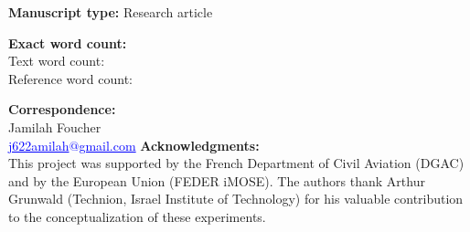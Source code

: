 \begin{titlepage}
\vspace{0.1cm}
{\bf Manuscript type:} Research article

\vspace{0.1cm}
{\bf Exact word count:}\\
Text word count:\\
Reference word count:

\vspace{0.1cm}
{\bf Correspondence:}\\
Jamilah Foucher\\
\textcolor{blue}{\underline{j622amilah$@$gmail.com}}
\newpage
{\bf Acknowledgments:}\\
This project was supported by the French Department of Civil Aviation (DGAC) and by the European Union (FEDER iMOSE). The authors thank Arthur Grunwald (Technion, Israel Institute of Technology) for his valuable contribution to the conceptualization of these experiments.

\end{titlepage}

